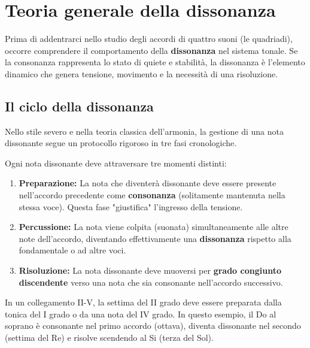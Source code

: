 \chapter{Teoria generale della dissonanza}
\label{chap:teoria_dissonanza}

Prima di addentrarci nello studio degli accordi di quattro suoni (le quadriadi), occorre comprendere il comportamento della \textbf{dissonanza} nel sistema tonale. Se la consonanza rappresenta lo stato di quiete e stabilità, la dissonanza è l'elemento dinamico che genera tensione, movimento e la necessità di una risoluzione.

\section{Il ciclo della dissonanza}
\label{sec:ciclo_dissonanza}

Nello stile severo e nella teoria classica dell'armonia, la gestione di una nota dissonante segue un protocollo rigoroso in tre fasi cronologiche.

\begin{regola}
        \label{reg:trattamento_dissonanza}
        Ogni nota dissonante deve attraversare tre momenti distinti:
        \begin{enumerate}
                \item \textbf{Preparazione:} La nota che diventerà dissonante deve essere presente nell'accordo precedente come \textbf{consonanza} (solitamente mantenuta nella stessa voce). Questa fase "giustifica" l'ingresso della tensione.
                \item \textbf{Percussione:} La nota viene colpita (suonata) simultaneamente alle altre note dell'accordo, diventando effettivamente una \textbf{dissonanza} rispetto alla fondamentale o ad altre voci.
                \item \textbf{Risoluzione:} La nota dissonante deve muoversi per \textbf{grado congiunto discendente} verso una nota che sia consonante nell'accordo successivo.
        \end{enumerate}
\end{regola}

\begin{esempio}
        \label{ex:ciclo_dissonanza}
        In un collegamento II-V, la settima del II grado deve essere preparata dalla tonica del I grado o da una nota del IV grado.
        In questo esempio, il Do al soprano è consonante nel primo accordo (ottava), diventa dissonante nel secondo (settima del Re) e risolve scendendo al Si (terza del Sol).
\end{esempio}

